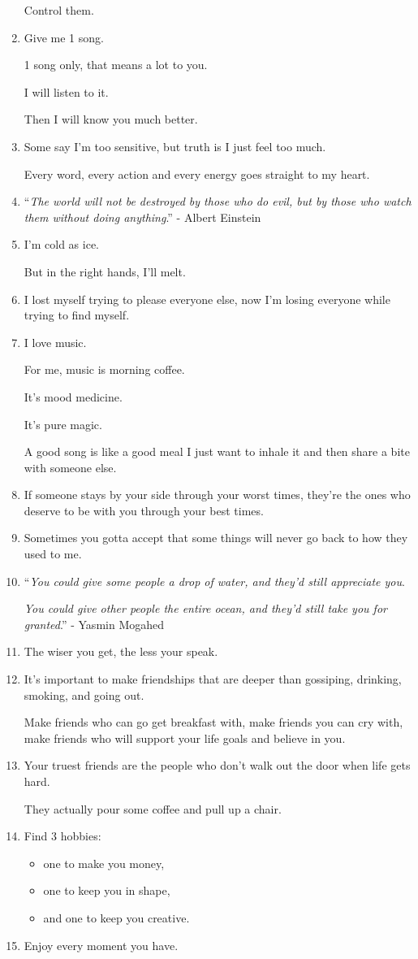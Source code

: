 \documentclass{article}
\begin{document}
\begin{enumerate}
	Control them.
	\item Give me 1 song.
	
	1 song only, that means a lot to you.
	
	I will listen to it.
	
	Then I will know you much better.
	\item Some say I'm too sensitive, but truth is I just feel too much.
	
	Every word, every action and every energy goes straight to my heart.
	\item ``\textit{The world will not be destroyed by those who do evil, but by those who watch them without doing anything}.'' - Albert Einstein
	\item I'm cold as ice.
	
	But in the right hands, I'll melt.
	\item I lost myself trying to please everyone else, now I'm losing everyone while trying to find myself.
	\item I love music.
	
	For me, music is morning coffee.
	
	It's mood medicine.
	
	It's pure magic.
	
	A good song is like a good meal I just want to inhale it and then share a bite with someone else.
	\item If someone stays by your side through your worst times, they're the ones who deserve to be with you through your best times.
	\item Sometimes you gotta accept that some things will never go back to how they used to me.
	\item ``\textit{You could give some people a drop of water, and they'd still appreciate you}.
	
	\textit{You could give other people the entire ocean, and they'd still take you for granted}.'' - Yasmin Mogahed
	\item The wiser you get, the less your speak.
	\item It's important to make friendships that are deeper than gossiping, drinking, smoking, and going out.
	
	Make friends who can go get breakfast with, make friends you can cry with, make friends who will support your life goals and believe in you.
	\item Your truest friends are the people who don't walk out the door when life gets hard.
	
	They actually pour some coffee and pull up a chair.
	\item Find 3 hobbies:
	\begin{itemize}
		\item one to make you money,
		\item one to keep you in shape,
		\item and one to keep you creative.
	\end{itemize}
	\item Enjoy every moment you have.
	

\end{enumerate}
\end{document}
